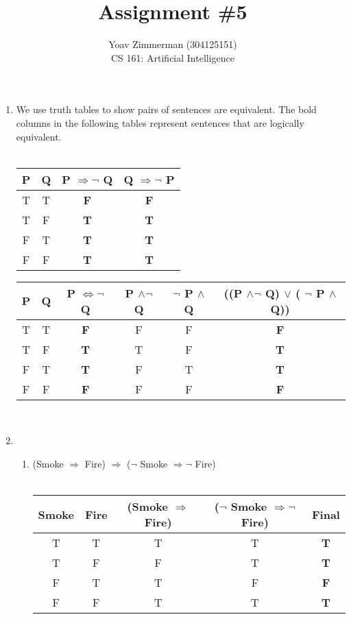 \documentclass[12pt]{article}
\begin{document}
\title{Assignment \#5}
\author{Yoav Zimmerman (304125151) \\
	    CS 161: Artificial Intelligence}
\maketitle


\begin{enumerate}

	\item We use truth tables to show pairs of sentences are equivalent. The bold columns in the following tables represent sentences that are logically equivalent. \\ 
	\\ 
	\begin{tabular}{ | c | c | >{\bf}c | >{\bf}c | }
	\hline
	P & Q & P $\Rightarrow \neg$ Q & Q $\Rightarrow \neg$ P \\
	\hline 
	T & T & F & F \\
	\hline 
	T & F & T & T \\
	\hline 
	F & T & T & T \\
	\hline 
	F & F & T & T \\
	\hline
	\end{tabular}
	
	\begin{tabular}{ | c | c | >{\bf}c | c | c | >{\bf}c |}
	\hline
	P & Q & P $\Leftrightarrow \neg$ Q & P $\land \neg$ Q & $\neg$ P $\land$ Q & ((P $\land \neg$ Q) $\lor$ ( $\neg$ P $\land$ Q)) \\
	\hline 
	T & T & F & F & F & F \\
	\hline 
	T & F & T & T & F & T \\
	\hline 
	F & T & T & F & T & T \\
	\hline 
	F & F & F & F & F & F \\
	\hline
	\end{tabular}
	\\
	
	\item 
	\begin{enumerate}
		\item (Smoke $\Rightarrow$ Fire) $\Rightarrow$ ($\neg$ Smoke $\Rightarrow \neg$ Fire) 
		\\
		\\
		\begin{tabular}{ | c | c | c | c | >{\bf}c |}
		\hline
		Smoke & Fire & (Smoke $\Rightarrow$ Fire) & ($\neg$ Smoke $\Rightarrow \neg$ Fire) & Final \\
		\hline 
		T & T & T & T & T \\
		\hline 
		T & F & F & T & T \\
		\hline 
		F & T & T & F & F \\
		\hline 
		F & F & T & T & T \\
		\hline
		\end{tabular}
		\\
		

\end{enumerate}
\end{enumerate}
\end{document}
